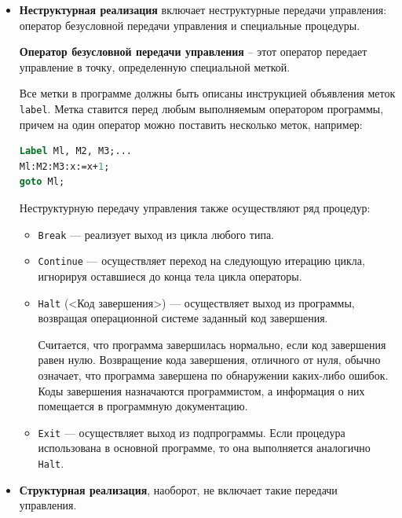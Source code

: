 \begin{itemize}
    \item {\bf{Неструктурная реализация}} включает неструктурные передачи управления: оператор безусловной передачи управления и специальные процедуры.
    
    {\bf{Оператор безусловной передачи управления}} – этот оператор передает управление в точку, определенную специальной меткой. 
    
    Все метки в программе должны быть описаны инструкцией объявления меток \texttt{label}. 
    Метка ставится перед любым выполняемым оператором программы, причем на один оператор можно поставить несколько меток, например:

    \begin{lstlisting}[language=Pascal]
Label Ml, M2, M3;...
Ml:M2:M3:x:=x+1;
goto Ml;\end{lstlisting}
    
    Неструктурную передачу управления также осуществляют ряд процедур:

    \begin{itemize}
        \item \texttt{Break} — реализует выход из цикла любого типа.
        
        \item \texttt{Continue} — осуществляет переход на следующую итерацию цикла, игнорируя оставшиеся до конца тела цикла операторы.
        
        \item \texttt{Halt} (<Код завершения>) — осуществляет выход из программы, возвращая операционной системе заданный код завершения. 
        
        Считается, что программа завершилась нормально, если код завершения равен нулю. Возвращение кода завершения, отличного от нуля, обычно означает, что программа завершена по обнаружении каких-либо ошибок. Коды завершения назначаются программистом, а информация о них помещается в программную документацию.

        \item \texttt{Exit} — осуществляет выход из подпрограммы. Если процедура использована в основной программе, то она выполняется аналогично \texttt{Halt}.
        
    \end{itemize}

    \item {\bf{Структурная реализация}}, наоборот, не включает такие передачи управления.

\end{itemize}

